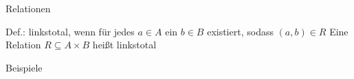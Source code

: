 	\begin{frame}{Relationen}
		\begin{block}{Def.: linkstotal}, wenn für jedes $a \in A$ ein $b \in B$ existiert, sodass $(a,b) \in R$
			Eine Relation $R \subseteq A \times B$ heißt linkstotal
		\end{block}
	
		\begin{exampleblock}{Beispiele}
	
		\end{exampleblock}
	\end{frame}



\section{}
\questionframe
\lastframe

